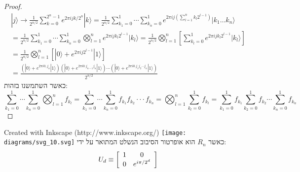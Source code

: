 \documentclass{tstextbook}
\begin{document}
\begin{proof}
\begin{gather*}|j\rangle \rightarrow \frac{1}{2^{n/2}} \sum_{k=0}^{2^n-1} e^{2\pi ijk/2^n} |k\rangle = \frac{1}{2^{n/2}} \sum_{k_1=0}^1 \cdots \sum_{k_n=0}^1 e^{2\pi ij (\sum_{l=1}^n k_l 2^{l-1})} |k_1 \dots k_n\rangle \\= \frac{1}{2^{n/2}} \sum_{k_1=0}^1 \cdots \sum_{k_n=0}^1 \bigotimes_{l=1}^n e^{2\pi ijk_l 2^{l-1}} |k_l\rangle = \frac{1}{2^{n/2}} \bigotimes_{l=1}^n \left[ \sum_{k_l=0}^1 e^{2\pi ijk_l 2^{l-1}} |k_l\rangle \right] \\= \frac{1}{2^{n/2}} \bigotimes_{l=1}^n \left[ |0\rangle + e^{2\pi ij2^{l-1}} |1\rangle \right] \\= \frac{(|0\rangle + e^{2\pi i0,j_n} |1\rangle)(|0\rangle + e^{2\pi i0.j_{n-1}j_n} |1\rangle) \cdots (|0\rangle + e^{2\pi i0.j_1j_2\cdots j_n} |1\rangle)}{2^{n/2}}
\end{gather*}
כאשר השתמשנו בזהות:
$$\sum_{k_{1}=0}^{1}\cdots\sum_{k_{n}=0}^{1}\bigotimes_{l=1}^{n}f_{k_{l}}=\sum_{k_{1}=0}^{1}\cdots\sum_{k_{n}=0}^{1}f_{k_{1}}f_{k_{2}}\cdot\cdot\cdot f_{k_{n}}=\bigotimes_{l=1}^{n}\sum_{k_{l}=0}^{1}f_{k_{l}}=\sum_{k_{1}=0}^{1}f_{k_{1}}\sum_{k_{2}=0}^{1}f_{k_{2}}\cdots\sum_{k_{n}=0}^{1}f_{k_{n}}$$

\end{proof}
 Created with Inkscape (http://www.inkscape.org/) \texttt{[image: diagrams/svg\_10.svg]}
כאשר \(R_{n}\) הוא אופרטור הסיבוב הנשלט המתואר על ידי:
$$U_{d}\equiv\left[\begin{array}{c c}{{1}}&{{0}}\\ {{0}}&{{e^{i\pi/2^{d}}}}\end{array}\right]$$
\end{document}

